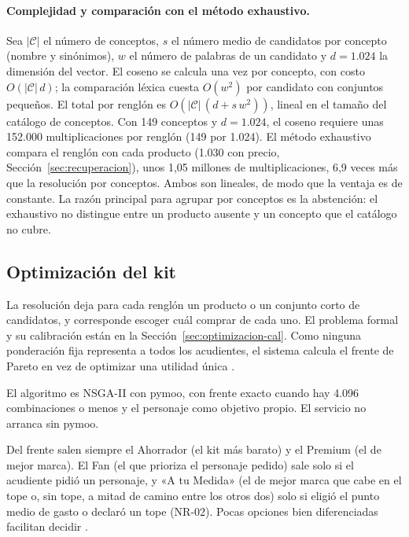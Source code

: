 \paragraph{Complejidad y comparación con el método exhaustivo.} Sea $|\mathcal{C}|$ el número de
conceptos, $s$ el número medio de candidatos por concepto (nombre y sinónimos), $w$ el número de
palabras de un candidato y $d=1.024$ la dimensión del vector. El coseno se calcula una vez por
concepto, con costo $O(|\mathcal{C}|\,d)$; la comparación léxica cuesta $O(w^2)$ por candidato con
conjuntos pequeños. El total por renglón es $O(|\mathcal{C}|\,(d+s\,w^2))$, lineal en el
tamaño del catálogo de conceptos. Con 149 conceptos y $d=1.024$, el coseno requiere unas 152.000
multiplicaciones por renglón (149 por 1.024). El método exhaustivo compara el renglón con cada producto (1.030 con precio,
Sección~\ref{sec:recuperacion}), unos 1,05 millones de multiplicaciones, 6,9 veces más que la
resolución por conceptos. Ambos son lineales, de modo que la ventaja es de constante. La razón
principal para agrupar por conceptos es la abstención: el exhaustivo no distingue entre un producto
ausente y un concepto que el catálogo no cubre.

\subsection{Optimización del kit}
\label{sec:optimizacion-dev}

La resolución deja para cada renglón un producto o un conjunto corto de candidatos, y corresponde escoger
cuál comprar de cada uno. El problema formal y su
calibración están en la Sección~\ref{sec:optimizacion-cal}. Como ninguna ponderación fija representa a
todos los acudientes, el sistema calcula el frente de Pareto en vez de optimizar una utilidad única \citep{zitzler_multiobjective_1999}.

El algoritmo es NSGA-II \citep{deb_fast_2002} con pymoo, con frente exacto cuando hay 4.096
combinaciones o menos y el personaje como objetivo propio. El servicio no arranca sin pymoo.

Del frente salen siempre el Ahorrador (el kit más barato) y el Premium (el de mejor marca). El Fan
(el que prioriza el personaje pedido) sale solo si el acudiente pidió un personaje, y «A tu Medida» (el de mejor marca que cabe en el tope o, sin tope, a mitad de camino entre
los otros dos) solo si eligió el punto medio de gasto o declaró un tope (NR-02). Pocas opciones bien
diferenciadas facilitan decidir \citep{thaler_nudge_2008,iyengar_when_2000,schwartz_paradox_2003}.

